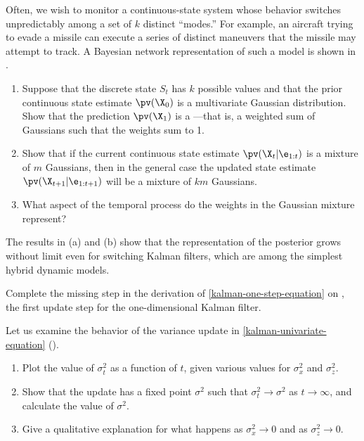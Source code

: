 \begin{exercise}
Often, we wish to monitor a continuous-state system whose behavior
switches unpredictably among a set of \(k\) distinct ``modes.'' For example,
an aircraft trying to evade a missile can execute a series of
distinct maneuvers that the missile may attempt to track. A Bayesian network
representation of such a  model is shown in
.
\begin{enumerate}
\item Suppose that the discrete state \(S_t\) has \(k\) possible values
and that the prior continuous state estimate \(\pv(\X_0)\) is a multivariate Gaussian
distribution. Show that the prediction \(\pv(\X_1)\) is a ---that is, a weighted sum of Gaussians such that the
weights sum to 1.
\item Show that if the current continuous state estimate
\(\pv(\X_t|\e_{1:t})\) is a mixture of \(m\) Gaussians, then in the
general case the updated state estimate \(\pv(\X_{t+1}|\e_{1:t+1})\)
will be a mixture of \(km\) Gaussians.
\item What aspect of the temporal process do the weights in the 
Gaussian mixture represent?
\end{enumerate}
The results in (a) and (b) show that the representation of the posterior
grows without limit even for switching Kalman filters, which are among the
simplest hybrid dynamic models.
\end{exercise} 

\begin{exercise}
Complete the missing step in the derivation of
\eqref{kalman-one-step-equation} on , the first update step
for the one-dimensional Kalman filter.
\end{exercise} 

\begin{exercise}
Let us examine the behavior of the variance update in 
\eqref{kalman-univariate-equation} ().
\begin{enumerate}
\item Plot the value of \(\sigma_t^2\) as a function of \(t\), given various
values for \(\sigma_x^2\) and \(\sigma_z^2\).

\item Show that the update has a fixed point \(\sigma^2\) such
that \(\sigma_t^2 \rightarrow \sigma^2\) as \(t \rightarrow \infty\), and
calculate the value of \(\sigma^2\).

\item Give a qualitative explanation for what
happens as \(\sigma_x^2\rightarrow 0\) and as \(\sigma_z^2\rightarrow 0\).
\end{enumerate}
\end{exercise} 


